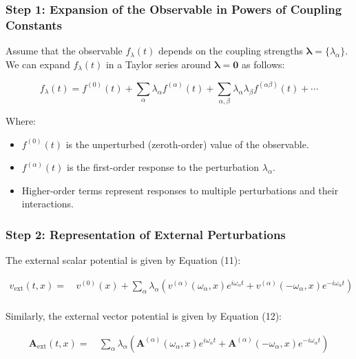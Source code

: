 \subsubsection*{Step 1: Expansion of the Observable in Powers of Coupling Constants}

Assume that the observable \( f_{\lambda}(t) \) depends on the coupling strengths \( \boldsymbol{\lambda} = \{\lambda_{\alpha}\} \). We can expand \( f_{\lambda}(t) \) in a Taylor series around \( \boldsymbol{\lambda} = \mathbf{0} \) as follows:

\[
f_{\lambda}(t) = f^{(0)}(t) + \sum_{\alpha} \lambda_{\alpha} f^{(\alpha)}(t) + \sum_{\alpha, \beta} \lambda_{\alpha} \lambda_{\beta} f^{(\alpha \beta)}(t) + \cdots
\]

Where:
\begin{itemize}
    \item \( f^{(0)}(t) \) is the unperturbed (zeroth-order) value of the observable.
    \item \( f^{(\alpha)}(t) \) is the first-order response to the perturbation \( \lambda_{\alpha} \).
    \item Higher-order terms represent responses to multiple perturbations and their interactions.
\end{itemize}

\subsubsection*{Step 2: Representation of External Perturbations}

The external scalar potential is given by Equation (11):

\[
\begin{aligned}
v_{\text{ext}}(t, x) = &\, v^{(0)}(x) + \sum_{\alpha} \lambda_{\alpha} \left( v^{(\alpha)}(\omega_{\alpha}, x) e^{i \omega_{\alpha} t} + v^{(\alpha)}(-\omega_{\alpha}, x) e^{-i \omega_{\alpha} t} \right) \\
\end{aligned} 
\]

\noindent Similarly, the external vector potential is given by Equation (12):

\[
\begin{aligned}
\mathbf{A}_{\text{ext}}(t, x) = &\, \sum_{\alpha} \lambda_{\alpha} \left( \mathbf{A}^{(\alpha)}(\omega_{\alpha}, x) e^{i \omega_{\alpha} t} + \mathbf{A}^{(\alpha)}(-\omega_{\alpha}, x) e^{-i \omega_{\alpha} t} \right)
\end{aligned} 
\]

